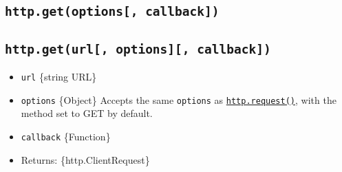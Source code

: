 \begin{Shaded}
\begin{Highlighting}[]
\OperatorTok{=} \NormalTok{(}\NormalTok{)}\OperatorTok{;}

\OperatorTok{=}\NormalTok{()}\OperatorTok{;}

\NormalTok{(}\OperatorTok{,}\OperatorTok{,}\KeywordTok{=\textgreater{}}\NormalTok{ \{}
\NormalTok{(}\OperatorTok{,}\NormalTok{ \{ }\OperatorTok{:} \NormalTok{ \})}\OperatorTok{;}
\NormalTok{(}\NormalTok{(\{}
    \OperatorTok{:} \OperatorTok{,}
\NormalTok{  \}))}\OperatorTok{;}
\NormalTok{\})}\OperatorTok{;}

\NormalTok{(}\NormalTok{)}\OperatorTok{;}
\end{Highlighting}
\end{Shaded}

\subsection{\texorpdfstring{\texttt{http.get(options{[},\ callback{]})}}{http.get(options{[}, callback{]})}}\label{http.getoptions-callback}

\subsection{\texorpdfstring{\texttt{http.get(url{[},\ options{]}{[},\ callback{]})}}{http.get(url{[}, options{]}{[}, callback{]})}}\label{http.geturl-options-callback}

\begin{itemize}
\tightlist
\item
  \texttt{url} \{string \textbar{} URL\}
\item
  \texttt{options} \{Object\} Accepts the same \texttt{options} as
  \hyperref[httprequestoptions-callback]{\texttt{http.request()}}, with
  the method set to GET by default.
\item
  \texttt{callback} \{Function\}
\item
  Returns: \{http.ClientRequest\}
\end{itemize}

